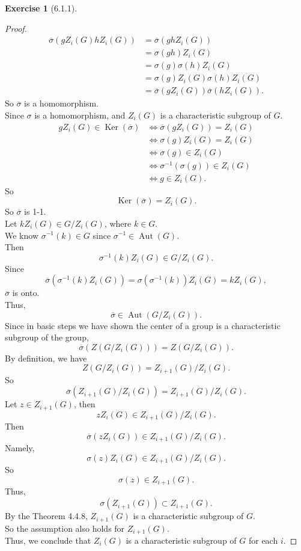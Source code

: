 \documentclass{amsart}
\renewcommand{\ker}{\operatorname{Ker}}
\theoremstyle{plain}
\theoremstyle{definition}
\newtheorem{exer}[lem]{Exercise}
\begin{document}
\begin{exer}[6.1.1]
\begin{proof}
\begin{align*}
	  \overline{\sigma}(gZ_i(G)hZ_i(G)) &= \overline{\sigma}(ghZ_i(G))\\
	  								 	&= \sigma(gh)Z_i(G)\\
	  									&=\sigma(g)\sigma(h)Z_i(G) \\
	  									&= \sigma(g)Z_i(G)\sigma(h)Z_i(G) \\
	  									&= \overline{\sigma}(gZ_i(G)) \overline{\sigma}(hZ_i(G)).
  	\end{align*}
  	So $\overline{\sigma}$ is a homomorphism.\\
  	Since $\sigma$ is a homomorphism, and $Z_i(G)$ is a characteristic subgroup of $G$.
  	\begin{align*}
  	gZ_i(G) \in \ker\left(\overline{\sigma}\right) &\Leftrightarrow \overline{\sigma}(gZ_i(G)) = Z_i(G) \\
  												   &\Leftrightarrow \sigma(g)Z_i(G) = Z_i(G) \\
  	  											   &\Leftrightarrow \sigma(g) \in Z_i(G) \\
  	  											   &\Leftrightarrow \sigma^{-1}(\sigma(g)) \in Z_i(G) \\
  	  											   &\Leftrightarrow g \in Z_i(G).
  	\end{align*}
	So
	\[\ker(\overline{\sigma}) = Z_i(G).\]
	So $\overline{\sigma}$ is 1-1.\\
	Let $kZ_i(G) \in G/Z_i(G)$, where $k \in G$.\\
	We know $\sigma^{-1}(k) \in G$ since $\sigma^{-1} \in \operatorname{Aut}(G)$.\\
	Then 
	\[\sigma^{-1}(k) Z_i(G) \in G/Z_i(G).\]
	Since 
	\[\overline{\sigma} \left(\sigma^{-1}(k)Z_i(G)\right) = \sigma(\sigma^{-1}(k)) Z_i(G) = kZ_i(G),\]
	$\overline{\sigma}$ is onto.\\
	Thus, 
	\[\overline{\sigma} \in \operatorname{Aut}\left(G/Z_i(G)\right).\]
	Since in basic steps we have shown the center of a group is a characteristic subgroup of the group,\\
	\[\overline{\sigma}\left(Z\left(G/Z_i(G)\right)\right) = Z\left(G/Z_i(G)\right). \]
	By definition, we have 
	\[Z\left(G/Z_i(G)\right)  = Z_{i+1}(G)/Z_i(G).\]
	So
  	\[\overline{\sigma}\left( Z_{i+1}(G)/Z_i(G) \right) = Z_{i+1}(G)/Z_i(G). \]
	Let $z \in Z_{i+1}(G)$, then 
		\[zZ_i(G) \in Z_{i+1}(G)/Z_i(G).\]
	Then
	\[\overline{\sigma}( zZ_i(G)) \in Z_{i+1}(G)/Z_i(G). \]
	Namely,
	\[\sigma(z)Z_i(G) \in  Z_{i+1}(G)/Z_i(G).\]
	So 
  	\[\sigma(z) \in Z_{i+1}(G).\]
	Thus,
  	\[\sigma\left(Z_{i+1}(G)\right) \subset Z_{i+1}(G).\]
	By the Theorem 4.4.8, $Z_{i+1}(G)$ is a characteristic subgroup of $G$.\\
	So the assumption also holds for $Z_{i+1}(G)$.\\
	Thus, we conclude that $Z_i(G)$ is a characteristic subgroup of $G$ for each $i$.
 \end{proof}
\end{exer}
\end{document}
